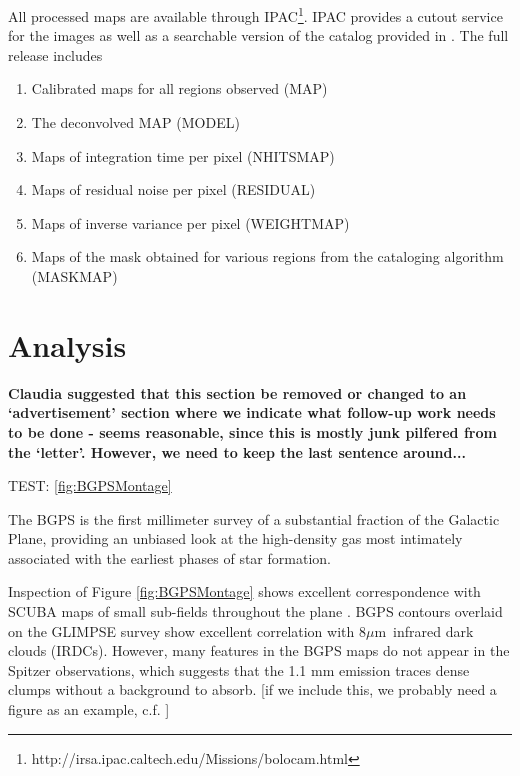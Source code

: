 \documentclass[12pt,preprint]{aastex}
\newcommand{\mum}{\ensuremath{\mu \mathrm{m}}}
\begin{document}
All processed maps are available through
IPAC\footnote{http://irsa.ipac.caltech.edu/Missions/bolocam.html}.
IPAC provides a cutout service for the images as well as a searchable
version of the catalog provided in \citet{rosolowsky09}.  The full
release includes
\begin{enumerate}
\item Calibrated maps for all regions observed (MAP)
\item The deconvolved MAP (MODEL)
\item Maps of integration time per pixel (NHITSMAP)
\item Maps of residual noise per pixel (RESIDUAL)
\item Maps of inverse variance per pixel (WEIGHTMAP)
\item Maps of the mask obtained for various regions from the cataloging algorithm (MASKMAP) \citep{rosolowsky09}
\end{enumerate}


\section{Analysis}
\label{sec:Analysis}

{\bf Claudia suggested that this section be removed or changed to an `advertisement' section
where we indicate what follow-up work needs to be done - seems reasonable, since this
is mostly junk pilfered from the `letter'.  However, we need to keep the last sentence around...}

TEST: \ref{fig:BGPSMontage}

The BGPS is the first millimeter survey of a substantial fraction
of the Galactic Plane, providing an unbiased look at the high-density
gas most intimately associated with the earliest phases of star
formation.  

Inspection of Figure \ref{fig:BGPSMontage} shows excellent
correspondence with SCUBA maps of small sub-fields throughout the
plane \citep{difrancesco08}.  BGPS contours overlaid on the GLIMPSE
survey \citep{benjamin03} show excellent correlation with 8\mum\
infrared dark clouds (IRDCs).  However, many features in the BGPS maps
do not appear in the Spitzer observations, which suggests that the 1.1
mm emission traces dense clumps without a background to absorb.  [if we
include this, we probably need a figure as an example, c.f. \citet{shuller09}]
\end{document}
